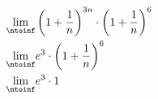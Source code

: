 
\begin{align}
    \lim_{\ntoinf}&\left( 1 + \frac{1}{n} \right)^{3n} 
    \cdot \left( 1 + \frac{1}{n} \right)^{6} \\
    \lim_{\ntoinf}&e^3
    \cdot \left( 1 + \frac{1}{n} \right)^{6} \\
    \lim_{\ntoinf}&e^3
    \cdot 1 \\
\end{align}

\pagebreak
